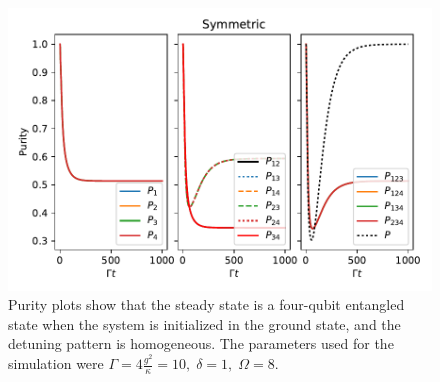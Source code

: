 \begin{figure}[h!]
\centering
\includegraphics[scale=.85]{Images/Sym_Homo.pdf}
    \caption{Purity plots show that the steady state is a four-qubit entangled state when the system is initialized in the ground state, and the detuning pattern is homogeneous. The parameters used for the simulation were $\Gamma= 4\frac{g^2}{\kappa}=10, \; \delta = 1, \; \Omega=8$.}
    \label{fig:}
\end{figure}
